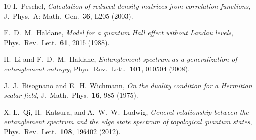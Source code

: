 \documentclass[aps,prb,twocolumn,superscriptaddress,floatfix]{revtex4-2}
\begin{document}
\begin{thebibliography}{10}
  I.~Peschel,
  \emph{Calculation of reduced density matrices from correlation functions},
  J.~Phys.\ A: Math.\ Gen.\ \textbf{36}, L205 (2003).

  F.~D.~M.~Haldane,
  \emph{Model for a quantum Hall effect without Landau levels},
  Phys.~Rev.~Lett.\ \textbf{61}, 2015 (1988).

  H.~Li and F.~D.~M.~Haldane,
  \emph{Entanglement spectrum as a generalization of entanglement entropy},
  Phys.~Rev.~Lett.\ \textbf{101}, 010504 (2008).

  J.~J.~Bisognano and E.~H.~Wichmann,
  \emph{On the duality condition for a Hermitian scalar field},
  J.~Math.~Phys.\ \textbf{16}, 985 (1975).

  X.-L.~Qi, H.~Katsura, and A.~W.~W.~Ludwig,
  \emph{General relationship between the entanglement spectrum and the
  edge state spectrum of topological quantum states},
  Phys.~Rev.~Lett.\ \textbf{108}, 196402 (2012).
\end{thebibliography}
\end{document}
